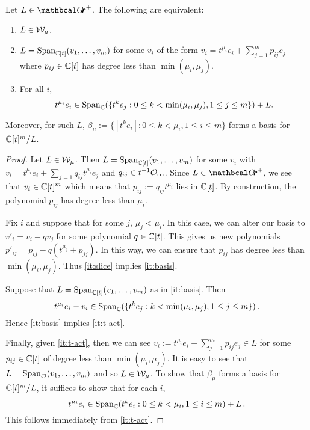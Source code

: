 \documentclass{article}
\begin{document}
\begin{lemma}\label{le:Wmu}
Let $ L \in \Grth^+$.  The following are equivalent:
\begin{enumerate}[label=(\roman*)]
    \item \label{it:slice} $ L \in \mathcal W_\mu$.
    \item \label{it:basis} $ L = \operatorname{Span}_{\mathbb C[t]}(v_1, \dots, v_m)$ for some $ v_i $ of the form $ v_i = t^{\mu_i} e_i + \sum_{j=1}^m p_{ij} e_j $ where $ p_{ij} \in \mathbb C[t] $ has degree less than $ \min(\mu_i, \mu_j)$.
    \item \label{it:t-act} For all $ i $, 
    $$ t^{\mu_i} e_i \in \operatorname{Span}_\mathbb C(\{t^k e_j : 0 \le k < \min(\mu_i, \mu_j), 1 \le j \le m \}) + L. $$
\end{enumerate}
Moreover, for such $L $, $ \beta_\mu := \{ [t^k e_i] : 0 \le k < \mu_i, 1 \le i \le m\}$ forms a basis for $ \mathbb C[t]^m/L$. 
\end{lemma}
% 
\begin{proof}
    Let $ L \in \mathcal W_\mu$.  Then $ L = \operatorname{Span}_{\mathbb C[t]}(v_1, \dots, v_m) $ for some $ v_i $ with $ v_i = t^{\mu_i} e_i + \sum_{j=1} q_{ij}t^{\mu_i} e_j $ and $ q_{ij} \in t^{-1} \mathcal O_\infty$.  Since $ L \in \Grth^+ $, we see that $ v_i \in \mathbb C[t]^m$ which means that $ p_{ij} := q_{ij}t^{\mu_i} $ lies in $ \mathbb C[t]$.  By construction, the polynomial $ p_{ij}$ has degree less than $ \mu_i$.
    
    Fix $ i$ and suppose that for some $ j$, $ \mu_j < \mu_i$.  In this case, we can alter our basis to $ v'_i = v_i - q v_j$ for some polynomial $q \in \mathbb C[t]$.  
    This gives us new polynomials $ p'_{ij} = p_{ij} - q (t^{\mu_j} + p_{jj}) $.  In this way, we can ensure that $ p_{ij} $ has degree less than $ \min(\mu_i, \mu_j)$.  
    Thus \cref{it:slice} implies \cref{it:basis}.
    
    Suppose that $ L = \operatorname{Span}_{\mathbb C[t]}(v_1, \dots, v_m)$ as in \cref{it:basis}.  Then
    $$t^{\mu_i} e_i - v_i \in \operatorname{Span}_\mathbb C(\{t^k e_j :  k < \min(\mu_i, \mu_j), 1 \le j \le m \})  \,. $$
    Hence \cref{it:basis} implies \cref{it:t-act}.  

    Finally, given \cref{it:t-act}, then we can see $ v_i := t^{\mu_i} e_i - \sum_{j=1}^m p_{ij} e_j \in L $ for some $ p_{ij} \in \mathbb C[t]$ of degree less than $ \min(\mu_i,\mu_j) $.  It is easy to see that $ L = \operatorname{Span}_\mathcal O(v_1, \dots, v_m) $ and so $ L \in \mathcal W_\mu$.  
    To show that $ \beta_\mu$ forms a basis for $ \mathbb C[t]^m/L$, it suffices to show that for each $ i$, 
    $$ t^{\mu_i} e_i  \in \operatorname{Span}_\mathbb C(  t^k e_i : 0 \le k < \mu_i, 1 \le i \le m) + L\,.$$ This follows immediately from \cref{it:t-act}.
\end{proof}
% 
\end{document}
